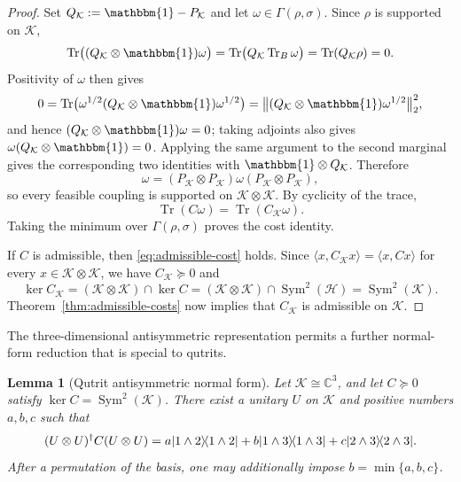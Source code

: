 \documentclass[11pt]{article}
\newtheorem{lemma}[theorem]{Lemma}
\newcommand{\ketbra}[2]{\ensuremath{\ket{#1}\!\bra{#2}}}
\newcommand{\Id}{\mathbbm{1}}
\DeclarePairedDelimiter\ket{\lvert}{\rangle}
\DeclarePairedDelimiter\bra{\langle}{\rvert}
\newcommand{\calH}{\mathcal{H}}
\newcommand{\calK}{\mathcal{K}}
\begin{document}
\begin{proof}
    Set $Q_{\calK}:=\Id-P_{\calK}$ and let
    $\omega\in\Gamma(\rho,\sigma)$.  Since $\rho$ is supported on $\calK$,
    \[
        \operatorname{Tr}\bigl((Q_{\calK}\otimes\Id)\omega\bigr)
        =\operatorname{Tr}\bigl(Q_{\calK}\operatorname{Tr}_B\omega\bigr)
        =\operatorname{Tr}(Q_{\calK}\rho)=0.
    \]
    Positivity of $\omega$ then gives
    \[
        0
        =\operatorname{Tr}\bigl(
          \omega^{1/2}(Q_{\calK}\otimes\Id)\omega^{1/2}
          \bigr)
        =\bigl\|(Q_{\calK}\otimes\Id)\omega^{1/2}\bigr\|_2^2,
    \]
    and hence $(Q_{\calK}\otimes\Id)\omega=0$; taking adjoints also gives
    $\omega(Q_{\calK}\otimes\Id)=0$.  Applying the same argument to the
    second marginal gives the corresponding two identities with
    $\Id\otimes Q_{\calK}$.  Therefore
    \[
        \omega
        =(P_{\calK}\otimes P_{\calK})\omega
         (P_{\calK}\otimes P_{\calK}),
    \]
    so every feasible coupling is supported on $\calK\otimes\calK$.  By
    cyclicity of the trace,
    \[
        \operatorname{Tr}(C\omega)
        =\operatorname{Tr}(C_{\calK}\omega).
    \]
    Taking the minimum over $\Gamma(\rho,\sigma)$ proves the cost identity.

    If $C$ is admissible, then \eqref{eq:admissible-cost} holds.  Since
    $\langle x,C_{\calK}x\rangle=\langle x,Cx\rangle$ for every
    $x\in\calK\otimes\calK$, we have $C_{\calK}\succeq0$ and
    \[
        \ker C_{\calK}
        =(\calK\otimes\calK)\cap\ker C
        =(\calK\otimes\calK)\cap\operatorname{Sym}^2(\calH)
        =\operatorname{Sym}^2(\calK).
    \]
    Theorem~\ref{thm:admissible-costs} now implies that $C_{\calK}$ is
    admissible on $\calK$.
\end{proof}

The three-dimensional antisymmetric representation permits a further
normal-form reduction that is special to qutrits.

\begin{lemma}[Qutrit antisymmetric normal form]\label{lem:qutrit-normal-form}
    Let $\calK\cong\mathbb{C}^3$, and let $C\succeq0$ satisfy
    $\ker C=\operatorname{Sym}^2(\calK)$.  There exist a unitary $U$ on
    $\calK$ and positive numbers $a,b,c$ such that
    \begin{equation}\label{eq:qutrit-normal-form}
        (U\otimes U)^\dagger C(U\otimes U)
        =a\ketbra{1\wedge2}{1\wedge2}
         +b\ketbra{1\wedge3}{1\wedge3}
         +c\ketbra{2\wedge3}{2\wedge3}.
    \end{equation}
    After a permutation of the basis, one may additionally impose
    $b=\min\{a,b,c\}$.
\end{lemma}
\end{document}
